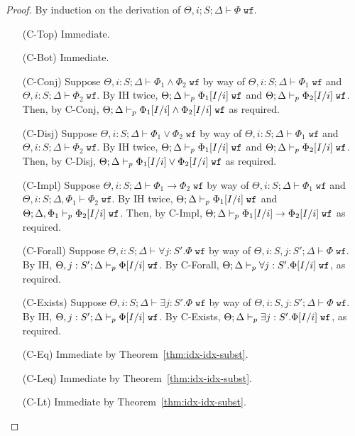 \begin{proof}
By induction on the derivation of $\Theta, i ; S ; \Delta \vdash \Phi \; \texttt{wf}$.
\begin{enumerate}
  \item[(C-Top)] Immediate.
  \item[(C-Bot)] Immediate.
  \item[(C-Conj)] Suppose $\Theta, i : S ; \Delta \vdash \Phi_1 \wedge \Phi_2 \; \texttt{wf}$ by way of
  $\Theta, i : S ; \Delta \vdash \Phi_1 \; \texttt{wf}$ and
  $\Theta, i : S ; \Delta \vdash \Phi_2 \; \texttt{wf}$.
  By IH twice,
  $\Theta; \Delta \vdash_p \Phi_1[I/i] \; \texttt{wf}$ and
  $\Theta; \Delta \vdash_p \Phi_2[I/i] \; \texttt{wf}$.
  Then, by C-Conj,
  $\Theta ; \Delta \vdash_p \Phi_1[I/i] \wedge \Phi_2[I/i] \; \texttt{wf}$
  as required.
  \item[(C-Disj)] Suppose $\Theta, i : S ; \Delta \vdash \Phi_1 \vee \Phi_2 \; \texttt{wf}$ by way of
  $\Theta, i : S ; \Delta \vdash \Phi_1 \; \texttt{wf}$ and
  $\Theta, i : S ; \Delta \vdash \Phi_2 \; \texttt{wf}$.
  By IH twice,
  $\Theta; \Delta \vdash_p \Phi_1[I/i] \; \texttt{wf}$ and
  $\Theta; \Delta \vdash_p \Phi_2[I/i] \; \texttt{wf}$.
  Then, by C-Disj,
  $\Theta ; \Delta \vdash_p \Phi_1[I/i] \vee \Phi_2[I/i] \; \texttt{wf}$
  as required.
  
  \item[(C-Impl)]  Suppose $\Theta, i : S ; \Delta \vdash \Phi_1 \to \Phi_2 \; \texttt{wf}$ by way of
  $\Theta, i : S ; \Delta \vdash \Phi_1 \; \texttt{wf}$ and
  $\Theta, i : S ; \Delta, \Phi_1 \vdash \Phi_2 \; \texttt{wf}$.
  By IH twice,
  $\Theta; \Delta \vdash_p \Phi_1[I/i] \; \texttt{wf}$ and
  $\Theta; \Delta, \Phi_1 \vdash_p \Phi_2[I/i] \; \texttt{wf}$.
  Then, by C-Impl,
  $\Theta ; \Delta \vdash_p \Phi_1[I/i] \to \Phi_2[I/i] \; \texttt{wf}$
  as required.
  
  \item[(C-Forall)] Suppose $\Theta, i : S ; \Delta \vdash \forall j : S'. \Phi \; \texttt{wf}$ by way of
  $\Theta, i : S, j : S' ; \Delta \vdash\Phi \; \texttt{wf}$.
  By IH,
  $\Theta, j : S' ; \Delta \vdash_p \Phi[I/i] \; \texttt{wf}$.
  By C-Forall,
  $\Theta;\Delta \vdash_p \forall j : S'. \Phi[I/i] \; \texttt{wf}$, as required.
  
  \item[(C-Exists)] Suppose $\Theta, i : S ; \Delta \vdash \exists j : S'. \Phi \; \texttt{wf}$ by way of
  $\Theta, i : S, j : S' ; \Delta \vdash\Phi \; \texttt{wf}$.
  By IH,
  $\Theta, j : S' ; \Delta \vdash_p \Phi[I/i] \; \texttt{wf}$.
  By C-Exists,
  $\Theta;\Delta \vdash_p \exists j : S'. \Phi[I/i] \; \texttt{wf}$, as required.
  
  \item[(C-Eq)] Immediate by Theorem~\ref{thm:idx-idx-subst}.
  \item[(C-Leq)] Immediate by Theorem~\ref{thm:idx-idx-subst}.
  \item[(C-Lt)] Immediate by Theorem~\ref{thm:idx-idx-subst}.
\end{enumerate}
\end{proof}